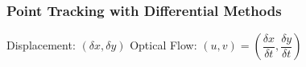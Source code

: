 \begin{frame}
  \frametitle{Point Tracking with Differential Methods}
  \begin{figure}[!h]
    \hspace*{2em}
  \end{figure}

  \begin{center}
    Displacement: $(\delta x, \delta y)$ \hspace*{2em} Optical Flow: $(u,v) = \left(\dfrac{\delta x}{\delta t}, \dfrac{\delta y}{\delta t}\right)$
  \end{center}

\end{frame}


